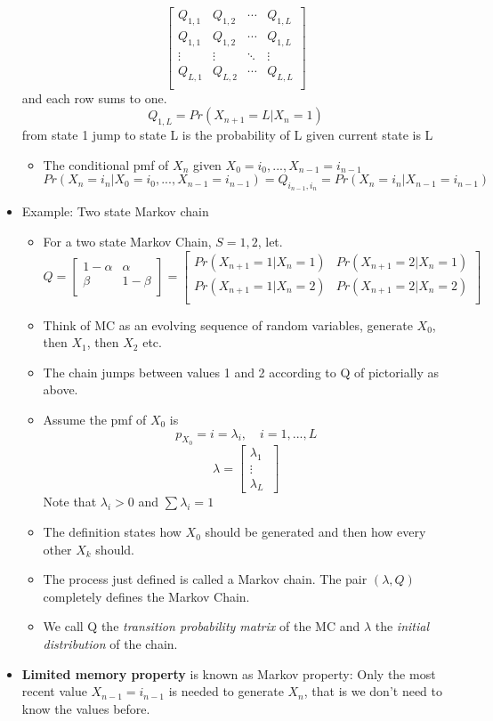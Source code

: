 \documentclass[12pt]{article}
\begin{document}
\begin{itemize}
\[
\begin{bmatrix}
Q_{1,1 } & Q_{1,2} & \cdots & Q_{1,L} \\
Q_{1,1 } & Q_{1,2} & \cdots & Q_{1,L} \\
\vdots & \vdots & \ddots & \vdots \\
Q_{L,1 } & Q_{L,2} & \cdots & Q_{L,L} \\
\end{bmatrix}
\]
and each row sums to one.
\[
Q_{1,L} = Pr(X_{n+1}=L | X_n = 1) 
\]
from state 1 jump to state L is the probability of L given  current state is L
\begin{itemize}
\item The conditional pmf of $X_n$ given $X_0=i_0,...,X_{n-1}=i_{n-1}$
\[Pr(X_n =i_n | X_0=i_0,...,X_{n-1}=i_{n-1}) = Q_{i_{n-1},i_n} = Pr(X_n =i_n | X_{n-1}=i_{n-1})
\]
\end{itemize}
\item Example: Two state Markov chain 
\begin{itemize}
\item For a two state Markov Chain, $S={1,2}$, let.
\[
Q = \begin{bmatrix}
1- \alpha & \alpha \\
\beta     & 1 - \beta \\
\end{bmatrix}
= \begin{bmatrix}
Pr(X_{n+1} =1 | X_n =1) & Pr(X_{n+1} = 2 | X_n =1) \\
Pr(X_{n+1} =1 | X_n =2) & Pr(X_{n+1} = 2 | X_n =2) \\
\end{bmatrix}
\]
\item Think of MC as an evolving sequence of random variables, generate $X_0$, then $X_1$, then $X_2$ etc.
\item The chain jumps between values 1 and 2 according to Q of pictorially as above.
\item Assume the pmf of $ X_0$ is 
\[
p_{X_0} =i = \lambda_i, \quad i=1,...,L
\]
\[
\lambda = \begin{bmatrix}
\lambda_1 \\
\vdots \\
\lambda_L
\
\end{bmatrix}
\]
Note that $\lambda_i > 0$ and $\sum \lambda_i = 1$
\item The definition states how $X_0$ should be generated and then how every other $X_k$ should.
\item The process just defined is called a Markov chain. The pair $(\lambda, Q)$ completely defines the Markov Chain.
\item We call Q the \textit{transition probability matrix} of the MC and $\lambda$ the \textit{initial distribution} of the chain. 
\end{itemize}
\item \textbf{Limited memory property } is known as Markov property: Only the most recent value $X_{n-1} = i_{n-1}$ is needed to generate $X_n$, that is we don't need to know the values before.
\end{itemize}
\end{document}
